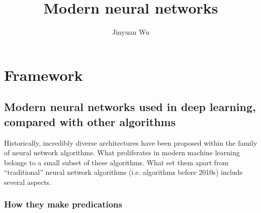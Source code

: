 \documentclass[hyperref, a4paper, 12pt]{report}
\title{Modern neural networks}
\author{Jinyuan Wu}
\begin{document}
\maketitle

\chapter{Framework}

\section{Modern neural networks used in deep learning, compared with other algorithms}
\label{sec:modern-network}

Historically, incredibly diverse architectures have been proposed within the family of neural network algorithms.
What proliferates in modern machine learning belongs to a small subset of these algorithms.
What set them apart from ``traditional'' neural network algorithms
(i.e. algorithms before 2010s) include several aspects.

\subsection{How they make predications}
\end{document}
